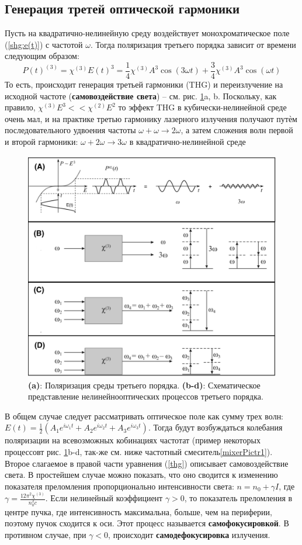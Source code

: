 \subsection*{Генерация третей оптической гармоники} 
Пусть на квадратично-нелинейную среду воздействует монохроматическое поле (\ref{shg:e(t)}) с частотой $\omega$. Тогда поляризация третьего порядка зависит от времени следующим образом:
\begin{equation}\label{thg}
P(t)^{(3)} = \chi^{(3)}E(t)^3 = \frac{1}{4}\chi^{(3)}A^3\cos(3\omega t) + \frac{3}{4}\chi^{(3)}A^3\cos(\omega t)
\end{equation}
То есть, происходит генерация третьей гармоники (THG) и переизлучение на исходной частоте (\textbf{самовоздействие света}) – см. рис. \ref{thg1}a, b. Поскольку, как правило, $\chi^{(3)}E^3 << \chi^{(2)}E^2$ то эффект THG в кубически-нелинейной среде очень мал, и на практике третью гармонику лазерного излучения получают путѐм последовательного удвоения частоты $\omega +  \omega \rightarrow 2\omega$, а затем сложения волн первой и второй гармоники: $\omega +  2\omega \rightarrow 3\omega$ в квадратично-нелинейной среде
\begin{figure}[h]
	\centering
	\includegraphics[width=0.8\linewidth]{images/thg.png}
	\caption{\textbf{(a)}: Поляризация среды третьего порядка. \textbf{(b-d)}: Схематическое представление нелинейнооптических процессов третьего порядка.}
	\label{thg1}
\end{figure}
В общем случае следует рассматривать оптическое поле как сумму трех волн: $E(t) = \frac{1}{2}(A_1e^{i\omega_1 t} + A_2e^{i\omega_2 t} + A_3e^{i\omega_3 t})$. Тогда будут возбуждаться колебания поляризации на всевозможных кобинациях частотат (пример некоторых процессовт рис. \ref{thg1}b-d, так-же см. ниже частотный смеситель\ref{mixerPictr1}). Второе слагаемое в правой части уравнения (\ref{thg}) описывает самовоздействие света. В простейшем случае можно показать, что оно сводится к изменению показателя преломления пропорционально интенсивности света: $n = n_0 + \gamma I$, где $ \gamma = \frac{12\pi^2 \chi^{(3)}}{n_{0}^{2}c} $. Если нелинейный коэффициент $\gamma > 0$, то показатель преломления в центре пучка, где интенсивность максимальна, больше, чем на периферии, поэтому пучок сходится к оси. Этот процесс называется \textbf{самофокусировкой}. В противном случае, при $\gamma < 0$, происходит \textbf{самодефокусировка} излучения. 

